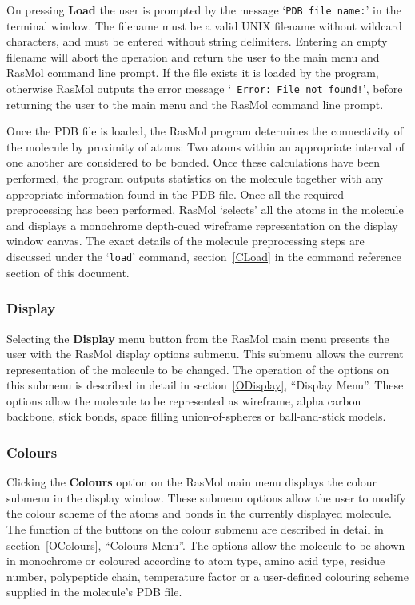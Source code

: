 On pressing {\bf Load} the user is prompted by the message `{\tt PDB file 
name:}' in the terminal window. The filename must be a valid UNIX filename
without wildcard characters, and must be entered without string delimiters. 
Entering an empty filename will abort the operation and return the user to 
the main menu and RasMol command line prompt. If the file exists it is 
loaded by the program, otherwise RasMol outputs the error message `{\tt 
Error: File not found!}', before returning the user to the main menu and 
the RasMol command line prompt.

Once the PDB file is loaded, the RasMol program determines the connectivity
of the molecule by proximity of atoms: Two atoms within an appropriate
interval of one another are considered to be bonded. Once these calculations
have been performed, the program outputs statistics on the molecule together
with any appropriate information found in the PDB file. Once all the 
required preprocessing has been performed, RasMol `selects' all the atoms in
the molecule and displays a monochrome depth-cued wireframe representation
on the display window canvas. The exact details of the molecule preprocessing
steps are discussed under the `{\tt load}' command, section~\ref{CLoad} in 
the command reference section of this document.


\subsubsection{Display}
\label{MDisplay}
Selecting the {\bf Display} menu button from the RasMol main menu presents
the user with the RasMol display options submenu. This submenu allows the
current representation of the molecule to be changed. The operation of the
options on this submenu is described in detail in section~\ref{ODisplay},
``Display Menu''. These options allow the molecule to be represented as 
wireframe, alpha carbon backbone, stick bonds, space filling union-of-spheres 
or ball-and-stick models.

\subsubsection{Colours}
\label{MColours}
Clicking the {\bf Colours} option on the RasMol main menu displays the
colour submenu in the display window. These submenu options allow the user
to modify the colour scheme of the atoms and bonds in the currently 
displayed molecule. The function of the buttons on the colour submenu are
described in detail in section~\ref{OColours}, ``Colours Menu''. The options 
allow the molecule to be shown in monochrome or coloured according to atom 
type, amino acid type, residue number, polypeptide chain, temperature factor 
or a user-defined colouring scheme supplied in the molecule's PDB file.

